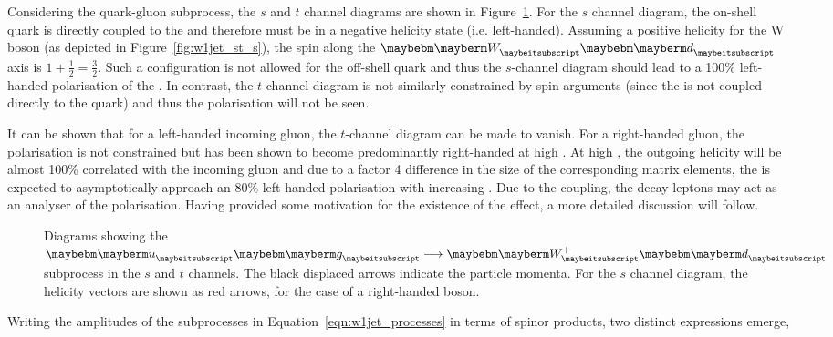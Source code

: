 Considering the quark-gluon subprocess, the $s$ and $t$ channel diagrams are
shown in Figure~\ref{fig:w1jet_st}. For the $s$ channel diagram, the on-shell
\Pdown quark is directly coupled to the \PW and therefore must be in a negative
helicity state (i.e. left-handed). Assuming a positive helicity for the W boson
(as depicted in Figure~\ref{fig:w1jet_st_s}), the spin along the $\PW\Pdown$
axis is $1+\frac{1}{2} = \frac{3}{2}$. Such a configuration is not allowed for the
\spinhalf off-shell quark and thus the $s$-channel diagram should lead to a 100\%
left-handed polarisation of the \PW. In contrast, the $t$ channel diagram is not
similarly constrained by spin arguments (since the \PW is not coupled directly
to the quark) and thus the polarisation will not be seen.

It can be shown that for a left-handed incoming gluon, the $t$-channel diagram
can be made to vanish. For a right-handed gluon, the \PW polarisation is not
constrained but has been shown to become predominantly right-handed at high
\PtW. At high \PtW, the outgoing \PW helicity will be almost 100\% correlated
with the incoming gluon and due to a factor 4 difference in the size of the
corresponding matrix elements, the \PW is expected to asymptotically approach an
80\% left-handed polarisation with increasing \PtW. Due to the \VminusA
coupling, the decay leptons may act as an analyser of the \PW
polarisation. Having provided some motivation for the existence of the effect, a
more detailed discussion will follow.

\begin{figure}
\centering
{}\quad
{}
\caption[]{Diagrams showing the $\Pup\Pgluon\longrightarrow\PWp\Pdown$ subprocess
  in the  $s$ and  $t$ channels. The black displaced arrows indicate the particle
  momenta. For the $s$ channel diagram, the helicity vectors are shown as red
  arrows, for the case of a right-handed \PW boson.}
\label{fig:w1jet_st}
\end{figure}

Writing the amplitudes of the subprocesses in Equation~\ref{eqn:w1jet_processes}
in terms of spinor products, two distinct expressions emerge,

